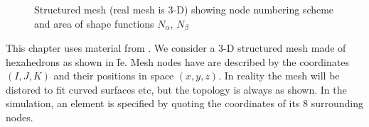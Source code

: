 \documentclass[a4paper]{article}
\begin{document}
\begin{figure}
  \caption{Structured mesh (real mesh is 3-D) showing node numbering
  scheme and area of shape functions $N_\alpha$, $N_\beta$}
  \label{fe}
\end{figure}

This chapter uses material from \cite{afem}. We consider a 3-D
structured mesh made of hexahedrons as shown in \f{fe}. Mesh nodes
have are described by the coordinates $(I,J,K)$ and their positions in
space $(x,y,z)$. In reality the mesh will be distored to fit curved
surfaces etc, but the topology is always as shown. In the simulation,
an element is specified by quoting the coordinates of its 8
surrounding nodes.
\end{document}
